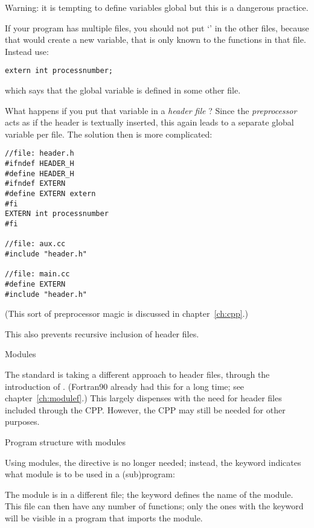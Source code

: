 Warning: it is tempting to define variables global but this is a
dangerous practice.

If your program has multiple files, you should not put `'
in the other files, because that would create a new variable, that is
only known to the functions in that file. Instead use:
\begin{lstlisting}
extern int processnumber;
\end{lstlisting}
which says that the global variable  is defined in
some other file.

What happens if you put that variable in a
%
\emph{header file}%
%
? Since the
%
\emph{preprocessor}%
acts as if the header is textually inserted, this again leads to
a separate global variable per file. The solution then is more
complicated:
\begin{lstlisting}
//file: header.h
#ifndef HEADER_H
#define HEADER_H
#ifndef EXTERN
#define EXTERN extern
#fi
EXTERN int processnumber
#fi

//file: aux.cc
#include "header.h"

//file: main.cc
#define EXTERN
#include "header.h"
\end{lstlisting}
(This sort of preprocessor magic is discussed in chapter~\ref{ch:cpp}.)

This also prevents recursive inclusion of header files.

 {Modules}

The  standard is taking a different approach
to header files, through the introduction of .
(Fortran90 already had this for a long time; see chapter~\ref{ch:modulef}.)
This largely dispenses with the need for
header files included through the \ac{CPP}.
However, the \ac{CPP} may still be needed for other purposes.

 {Program structure with modules}

Using modules, the  directive is no longer needed;
instead, the  keyword indicates what module is to be used
in a (sub)program:
%

The module is in a different file; the
 keyword defines the name of the module.
This file can then have any number of functions;
only the ones with the  keyword will be
visible in a program that imports the module.
%

